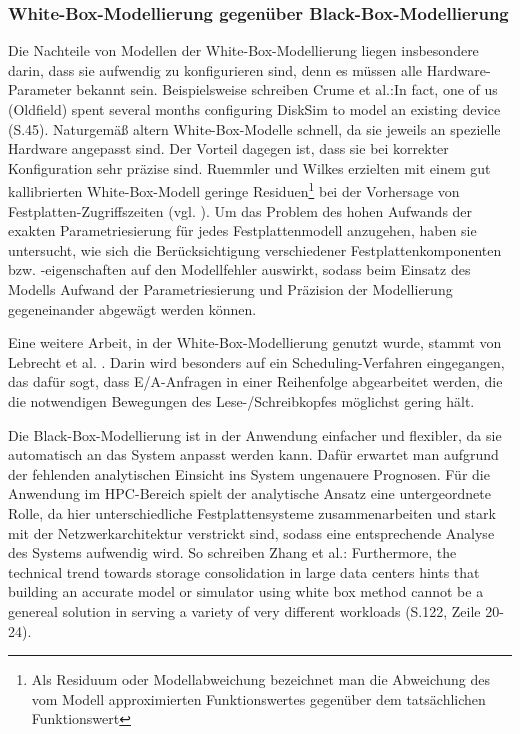 \documentclass[
	twoside,
	12pt,
	a4paper,
	BCOR10mm,
	DIV14,
	listof=totoc,
	bibliography=totoc,
	headsepline
]{scrreprt}
\begin{document}
\subsubsection{White-Box-Modellierung gegenüber Black-Box-Modellierung}
Die Nachteile von Modellen der White-Box-Modellierung liegen insbesondere darin, dass sie aufwendig zu konfigurieren sind, denn es müssen alle Hardware-Parameter bekannt sein. Beispielsweise schreiben Crume et al.:\glqq In fact, one of us (Oldfield) spent several months configuring DiskSim to model an existing device\grqq{} \cite{Crume:2013:FML:2538542.2538561} (S.45). Naturgemäß altern White-Box-Modelle schnell, da sie jeweils an spezielle Hardware angepasst sind. Der Vorteil dagegen ist, dass sie bei korrekter Konfiguration sehr präzise sind. Ruemmler und Wilkes erzielten mit einem gut kallibrierten White-Box-Modell geringe Residuen\footnote{Als Residuum oder Modellabweichung bezeichnet man die Abweichung des vom Modell approximierten Funktionswertes gegenüber dem tatsächlichen Funktionswert} bei der Vorhersage von Festplatten-Zugriffszeiten (vgl. \cite{Ruemmler94anintroduction}). Um das Problem des hohen Aufwands der exakten Parametriesierung für jedes Festplattenmodell anzugehen, haben sie untersucht, wie sich die Berücksichtigung verschiedener Festplattenkomponenten bzw. -eigenschaften auf den Modellfehler auswirkt, sodass beim Einsatz des Modells Aufwand der Parametriesierung und Präzision der Modellierung gegeneinander abgewägt werden können.

Eine weitere Arbeit, in der White-Box-Modellierung genutzt wurde, stammt von Lebrecht et al. \cite{Lebrecht:2009:10.1109/QEST.2009.31}. Darin wird besonders auf ein Scheduling-Verfahren eingegangen, das dafür sogt, dass E/A-Anfragen in einer Reihenfolge abgearbeitet werden, die die notwendigen Bewegungen des Lese-/Schreibkopfes möglichst gering hält.
\medskip

Die Black-Box-Modellierung ist in der Anwendung einfacher und flexibler, da sie automatisch an das System anpasst werden kann. Dafür erwartet man aufgrund der fehlenden analytischen Einsicht ins System ungenauere Prognosen. Für die Anwendung im HPC-Bereich spielt der analytische Ansatz eine untergeordnete Rolle, da hier unterschiedliche Festplattensysteme zusammenarbeiten und stark mit der Netzwerkarchitektur verstrickt sind, sodass eine entsprechende Analyse des Systems aufwendig wird. So schreiben Zhang et al.: \glqq Furthermore, the technical trend towards storage consolidation in large data centers hints that building an accurate model or simulator using white box method cannot be a genereal solution in serving a variety of very different workloads\grqq{} \cite{DBLP:conf/npc/ZhangLZJC10} (S.122, Zeile 20-24).
\end{document}
